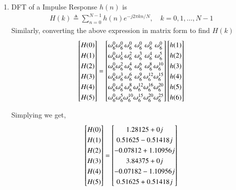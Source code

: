 \documentclass[journal,12pt,twocolumn]{IEEEtran}
\renewcommand\thesection{\arabic{section}}
\begin{document}
\begin{enumerate}[label=\thesection.\arabic*.,ref=\thesection.\theenumi]
\item DFT of a Impulse Response $h(n)$ is 
\begin{align}
    H(k) \triangleq \sum_{n=0}^{N-1} h(n) e^{-j 2 \pi k n / N}, \quad k=0,1, \ldots, N-1
\end{align}
Similarly, converting the above expression in matrix form to find $H(k)$
\begin{equation}
\renewcommand{\arraystretch}{1.25}
\setlength\arraycolsep{0.01pt}
\begin{bmatrix} 
H(0) \\ H(1) \\ H(2) \\ H(3) \\ H(4) \\ H(5) 
\end{bmatrix}
=
\begin{bmatrix}
\omega^{0}_{6} & \omega^{0}_{6} & \omega^{0}_{6} & \omega^{0}_{6} & \omega^{0}_{6} & \omega^{0}_{6}\\
\omega^{0}_{6} & \omega^{1}_{6} & \omega^{2}_{6} & \omega^{3}_{6} & \omega^{4}_{6} & \omega^{5}_{6}\\
\omega^{0}_{6} & \omega^{2}_{6} & \omega^{4}_{6} & \omega^{6}_{6} & \omega^{8}_{6} & \omega^{10}_{6}\\
\omega^{0}_{6} & \omega^{3}_{6} & \omega^{6}_{6} & \omega^{9}_{6} & \omega^{12}_{6} & \omega^{15}_{6}\\
\omega^{0}_{6} & \omega^{4}_{6} & \omega^{8}_{6} & \omega^{12}_{6} & \omega^{16}_{6} & \omega^{20}_{6}\\
\omega^{0}_{6} & \omega^{5}_{6} & \omega^{10}_{6} & \omega^{15}_{6} & \omega^{20}_{6} & \omega^{25}_{6} 
\end{bmatrix}
\begin{bmatrix}
h(1) \\ h(2) \\ h(3) \\ h(4) \\ h(5) \\ h(6)
\end{bmatrix}
\end{equation}

Simplying we get,
\begin{equation}
\renewcommand{\arraystretch}{1.25}
\setlength\arraycolsep{0.01pt}
\begin{bmatrix} 
H(0) \\ H(1) \\ H(2) \\ H(3) \\ H(4) \\ H(5) 
\end{bmatrix}
=
\begin{bmatrix}
1.28125+0j \\ 0.51625-0.51418j \\ -0.07812+1.10956j  \\ 3.84375+0j \\ -0.07182-1.10956j \\ 0.51625+0.51418j
\end{bmatrix}
\end{equation}




\end{enumerate}
\end{document}
